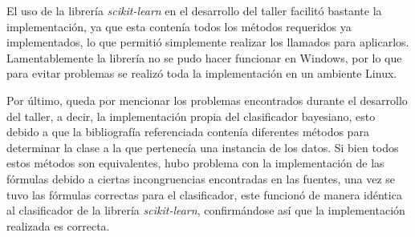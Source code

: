 \documentclass[letter, titlepage, 10pt]{article}
\begin{document}
El uso de la librería \textit{scikit-learn} en el desarrollo del taller facilitó bastante la implementación, ya que esta contenía todos los métodos requeridos ya implementados, lo que permitió simplemente realizar los llamados para aplicarlos. Lamentablemente la librería no se pudo hacer funcionar en Windows, por lo que para evitar problemas se realizó toda la implementación en un ambiente Linux.

Por último, queda por mencionar los problemas encontrados durante el desarrollo del taller, a decir, la implementación propia del clasificador bayesiano, esto debido a que la bibliografía referenciada contenía diferentes métodos para determinar la clase a la que pertenecía una instancia de los datos. Si bien todos estos métodos son equivalentes, hubo problema con la implementación de las fórmulas debido a ciertas incongruencias encontradas en las fuentes, una vez se tuvo las fórmulas correctas para el clasificador, este funcionó de manera idéntica al clasificador de la librería \textit{scikit-learn}, confirmándose así que la implementación realizada es correcta.


\newpage


\end{document}
